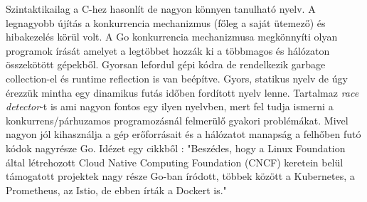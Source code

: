 Szintaktikailag a C-hez hasonlít de nagyon könnyen tanulható nyelv.
A legnagyobb újítás a konkurrencia mechanizmus (főleg a saját ütemező) és hibakezelés körül volt.
A Go konkurrencia mechanizmusa megkönnyíti olyan programok írását amelyet a legtöbbet hozzák ki a többmagos és hálózaton összekötött gépekből.
Gyorsan lefordul gépi kódra de rendelkezik garbage collection-el és runtime reflection is van beépítve.
Gyors, statikus nyelv de úgy érezzük mintha egy dinamikus futás időben fordított nyelv lenne.
Tartalmaz \textit{race detector}-t is ami nagyon fontos egy ilyen nyelvben, mert fel tudja ismerni a konkurrens/párhuzamos programozásnál felmerülő gyakori problémákat.
Mivel nagyon jól kihasználja a gép erőforrásait és a hálózatot manapság a felhőben futó kódok nagyrésze Go.
Idézet egy cikkből \cite{HWSW}:
"Beszédes, hogy a Linux Foundation által létrehozott Cloud Native Computing Foundation (CNCF) keretein
belül támogatott projektek nagy része Go-ban íródott, többek között a Kubernetes, a Prometheus, az Istio, de ebben írták a Dockert is."


